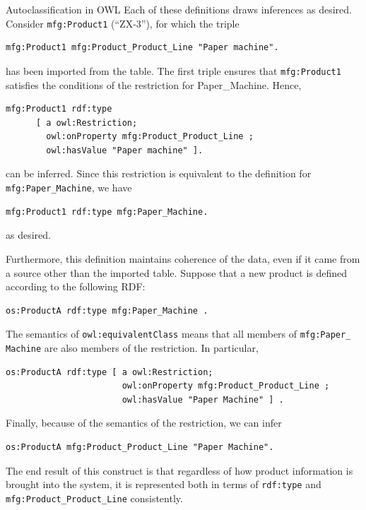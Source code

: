 \begin{challenge}{Autoclassification in OWL}
Each of these definitions draws inferences as desired. Consider
\texttt{mfg:Product1} (``ZX-3''), for which the triple

\begin{lstlisting}
mfg:Product1 mfg:Product_Product_Line "Paper machine".
\end{lstlisting}

has been imported from the table. The first triple ensures that
\texttt{mfg:Product1} satisfies the conditions of the restriction for
Paper\_Machine. Hence,

\begin{lstlisting}
mfg:Product1 rdf:type 
      [ a owl:Restriction; 
        owl:onProperty mfg:Product_Product_Line ;
        owl:hasValue "Paper machine" ].
\end{lstlisting}

can be inferred. Since this restriction is equivalent to the definition
for \texttt{mfg:Paper\_Machine}, we have

\begin{lstlisting}
mfg:Product1 rdf:type mfg:Paper_Machine.
\end{lstlisting}

as desired.

Furthermore, this definition maintains coherence of the data, even if it
came from a source other than the imported table. Suppose that a new
product is defined according to the following RDF:

\begin{lstlisting}
os:ProductA rdf:type mfg:Paper_Machine .
\end{lstlisting}

The semantics of \texttt{owl:equivalentClass} means that all members of
\texttt{mfg:Paper\_ Machine} are also members of the restriction. In particular,

\begin{lstlisting}
os:ProductA rdf:type [ a owl:Restriction;
                       owl:onProperty mfg:Product_Product_Line ;
                       owl:hasValue "Paper Machine" ] .
\end{lstlisting}

Finally, because of the semantics of the restriction, we can infer

\begin{lstlisting}
os:ProductA mfg:Product_Product_Line "Paper Machine".
\end{lstlisting}

The end result of this construct is that regardless of how product
information is brought into the system, it is represented both in terms
of \texttt{rdf:type} and \texttt{mfg:Product\_Product\_Line} consistently.
\end{challenge}

